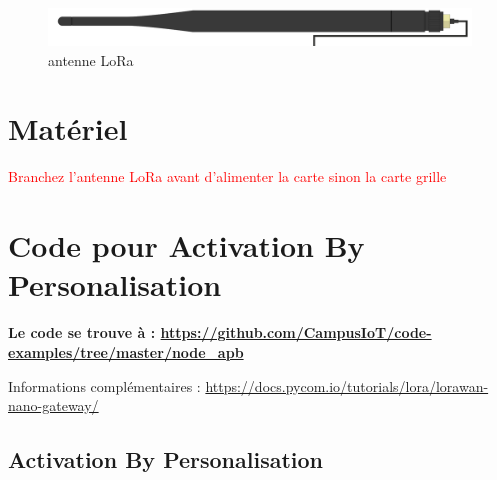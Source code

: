 \documentclass{article}
\begin{document}
    \begin{figure}[H]
\begin{center}
\advance\leftskip-3cm
\advance\rightskip-3cm
\includegraphics[keepaspectratio=true,scale=0.2]{lora_antenna.png}
\caption{antenne LoRa}
\label{visina8}
\end{center}\end{figure}



\section{Matériel}
\textcolor{red}{Branchez l'antenne LoRa avant d'alimenter la carte sinon la carte grille}





\section{Code pour Activation By Personalisation}



\textbf{Le code se trouve à : \url{https://github.com/CampusIoT/code-examples/tree/master/node_apb}}

Informations complémentaires : \url{https://docs.pycom.io/tutorials/lora/lorawan-nano-gateway/}\\

\subsection{Activation By Personalisation}
\end{document}
